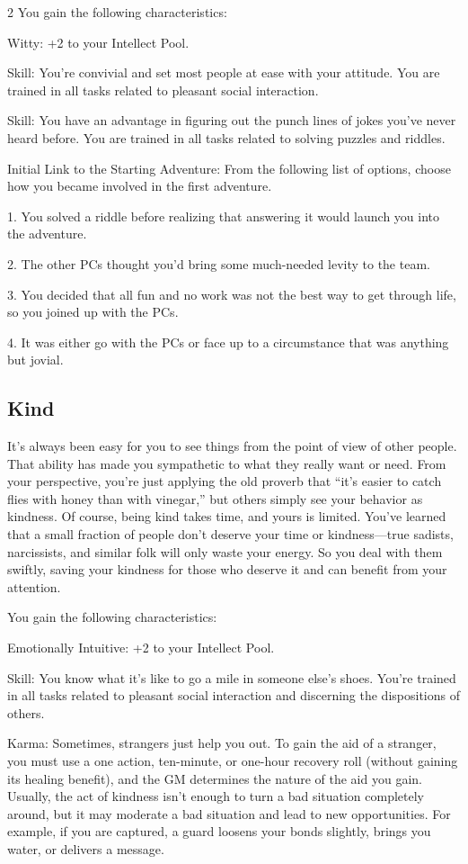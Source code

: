 \begin{multicols}{2}
You gain the following characteristics:

Witty: +2 to your Intellect Pool.

Skill: You’re convivial and set most people at ease with your attitude. You are trained in all tasks related to pleasant social interaction.

Skill: You have an advantage in figuring out the punch lines of jokes you’ve never heard before. You are trained in all tasks related to solving puzzles and riddles.

Initial Link to the Starting Adventure: From the following list of options, choose how you became involved in the first adventure.

1. You solved a riddle before realizing that answering it would launch you into the adventure.

2. The other PCs thought you’d bring some much-needed levity to the team.

3. You decided that all fun and no work was not the best way to get through life, so you joined up with the PCs.

4. It was either go with the PCs or face up to a circumstance that was anything but jovial.

\subsection{Kind}

It’s always been easy for you to see things from the point of view of other people. That ability has made you sympathetic to what they really want or need. From your perspective, you’re just applying the old proverb that “it’s easier to catch flies with honey than with vinegar,” but others simply see your behavior as kindness. Of course, being kind takes time, and yours is limited. You’ve learned that a small fraction of people don’t deserve your time or kindness—true sadists, narcissists, and similar folk will only waste your energy. So you deal with them swiftly, saving your kindness for those who deserve it and can benefit from your attention.

You gain the following characteristics:

Emotionally Intuitive: +2 to your Intellect Pool.

Skill: You know what it’s like to go a mile in someone else’s shoes. You’re trained in all tasks related to pleasant social interaction and discerning the dispositions of others.

Karma: Sometimes, strangers just help you out. To gain the aid of a stranger, you must use a one action, ten-minute, or one-hour recovery roll (without gaining its healing benefit), and the GM determines the nature of the aid you gain. Usually, the act of kindness isn’t enough to turn a bad situation completely around, but it may moderate a bad situation and lead to new opportunities. For example, if you are captured, a guard loosens your bonds slightly, brings you water, or delivers a message.


\end{multicols}
